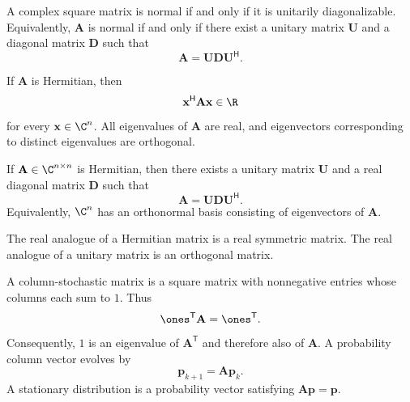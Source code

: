     \begin{theorem}
        A complex square matrix is normal if and only if it is unitarily
        diagonalizable. Equivalently, $\mathbf{A}$ is normal if and only if
        there exist a unitary matrix $\mathbf{U}$ and a diagonal matrix
        $\mathbf{D}$ such that
        \[
            \mathbf{A}
            =
            \mathbf{U}\mathbf{D}\mathbf{U}^{\mathsf H}.
        \]
    \end{theorem}

    \begin{proposition}
        If $\mathbf{A}$ is Hermitian, then
        \[
            \mathbf{x}^{\mathsf H}\mathbf{A}\mathbf{x}\in\R
        \]
        for every $\mathbf{x}\in\C^n$. All eigenvalues of $\mathbf{A}$ are real,
        and eigenvectors corresponding to distinct eigenvalues are orthogonal.
    \end{proposition}

    \begin{theorem}
        If $\mathbf{A}\in\C^{n\times n}$ is Hermitian, then there exists a
        unitary matrix $\mathbf{U}$ and a real diagonal matrix $\mathbf{D}$ such that
        \[
            \mathbf{A}
            =
            \mathbf{U}\mathbf{D}\mathbf{U}^{\mathsf H}.
        \]
        Equivalently, $\C^n$ has an orthonormal basis consisting of eigenvectors
        of $\mathbf{A}$.
    \end{theorem}

    \begin{remark}
        The real analogue of a Hermitian matrix is a real symmetric matrix.
        The real analogue of a unitary matrix is an orthogonal matrix.
    \end{remark}

    \begin{definition}
        A column-stochastic matrix is a square matrix with nonnegative entries
        whose columns each sum to $1$. Thus
        \[
            \ones^{\mathsf T}\mathbf{A}=\ones^{\mathsf T}.
        \]
        Consequently, $1$ is an eigenvalue of $\mathbf{A}^{\mathsf T}$ and
        therefore also of $\mathbf{A}$. A probability column vector evolves by
        \[
            \mathbf{p}_{k+1}=\mathbf{A}\mathbf{p}_k.
        \]
        A stationary distribution is a probability vector satisfying
        $\mathbf{A}\mathbf{p}=\mathbf{p}$.
    \end{definition}

